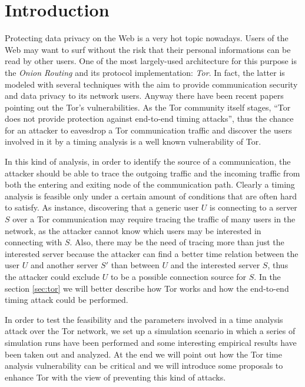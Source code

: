 \section{Introduction}
Protecting data privacy on the Web is a very hot topic nowadays. 
Users of the Web may want to surf without the risk that their personal
informations can be read by other users. %
One of the most largely-used
architecture for this purpose is the \emph{Onion Routing} and its
protocol implementation: \emph{Tor}\cite{tor}. In fact, the latter is modeled with
several techniques with the aim to provide communication security and
data privacy to its network users. Anyway there have been recent papers
 pointing out the Tor's vulnerabilities. %
 As the Tor community itself stages, ``Tor does not provide protection
 against end-to-end timing attacks''\cite{tor-overview}, thus the
 chance for an attacker to eavesdrop a Tor communication traffic and
 discover the users involved in it by a
 timing analysis is a well known vulnerability of Tor. 
 
 In this kind of analysis, in order to
 identify the source of a communication, the attacker should be able to
 trace the outgoing traffic and the incoming traffic from both the
 entering and exiting node of the communication path.
 Clearly a timing analysis is feasible only under a certain amount of
 conditions that are often hard to satisfy. As instance, discovering
 that a generic user $U$ is connecting to a server $S$ over a Tor
 communication may require tracing the traffic of many users in the
 network, as the
 attacker cannot know which users may be interested in connecting with
 $S$. Also, there may be the need of tracing more than just the
 interested server because the attacker can find a better time
 relation between the user $U$ and another server $S'$ than between $U$
 and the interested server $S$, thus the attacker could exclude $U$ to be a possible
 connection source for $S$.
 In the section
 \ref{sec:tor} we will better describe how Tor works and how the
 end-to-end timing attack could be performed.
 
 In order to test the feasibility and the parameters involved in
 a time analysis attack over the Tor network, we set up a simulation
 scenario in which a series of simulation runs have been performed and some interesting
 empirical results have been taken out and analyzed.
 At the end we will point out how the Tor time analysis vulnerability can be
 critical and we will introduce some proposals to enhance Tor with the
 view of preventing this kind of attacks. %
 

